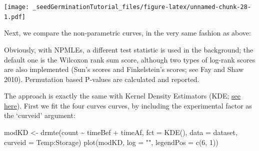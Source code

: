 \documentclass[
]{book}
\newenvironment{Shaded}{\begin{snugshade}}{\end{snugshade}}
\newcommand{\AttributeTok}[1]{\textcolor[rgb]{0.77,0.63,0.00}{#1}}
\newcommand{\DecValTok}[1]{\textcolor[rgb]{0.00,0.00,0.81}{#1}}
\newcommand{\DocumentationTok}[1]{\textcolor[rgb]{0.56,0.35,0.01}{\textbf{\textit{#1}}}}
\newcommand{\FunctionTok}[1]{\textcolor[rgb]{0.00,0.00,0.00}{#1}}
\newcommand{\NormalTok}[1]{#1}
\newcommand{\OtherTok}[1]{\textcolor[rgb]{0.56,0.35,0.01}{#1}}
\newcommand{\SpecialCharTok}[1]{\textcolor[rgb]{0.00,0.00,0.00}{#1}}
\newcommand{\StringTok}[1]{\textcolor[rgb]{0.31,0.60,0.02}{#1}}
\begin{document}
\texttt{[image: \_seedGerminationTutorial\_files/figure-latex/unnamed-chunk-28-1.pdf]}

Next, we compare the non-parametric curves, in the very same fashion as above:

\begin{Shaded}
\end{Shaded}

Obviously, with NPMLEs, a different test statistic is used in the background; the default one is the Wilcoxon rank sum score, although two types of log-rank scores are also implemented (Sun's scores and Finkelstein's scores; see Fay and Shaw 2010). Permutation based P-values are calculated and reported.

The approach is exactly the same with Kernel Density Estimators (KDE; \href{https://www.statforbiology.com/2021/stat_drcte_4-time-to-eventcurves/}{see here}). First we fit the four curves curves, by including the experimental factor as the `curveid' argument:

\begin{Shaded}
\begin{Highlighting}[]
\NormalTok{modKD }\OtherTok{\textless{}{-}} \FunctionTok{drmte}\NormalTok{(count }\SpecialCharTok{\textasciitilde{}}\NormalTok{ timeBef }\SpecialCharTok{+}\NormalTok{ timeAf, }\AttributeTok{fct =} \FunctionTok{KDE}\NormalTok{(),}
            \AttributeTok{data =}\NormalTok{ dataset, }
            \AttributeTok{curveid =}\NormalTok{ Temp}\SpecialCharTok{:}\NormalTok{Storage)}
\FunctionTok{plot}\NormalTok{(modKD, }\AttributeTok{log =} \StringTok{""}\NormalTok{, }\AttributeTok{legendPos =} \FunctionTok{c}\NormalTok{(}\DecValTok{6}\NormalTok{, }\DecValTok{1}\NormalTok{))}
\end{Highlighting}
\end{Shaded}
\end{document}
